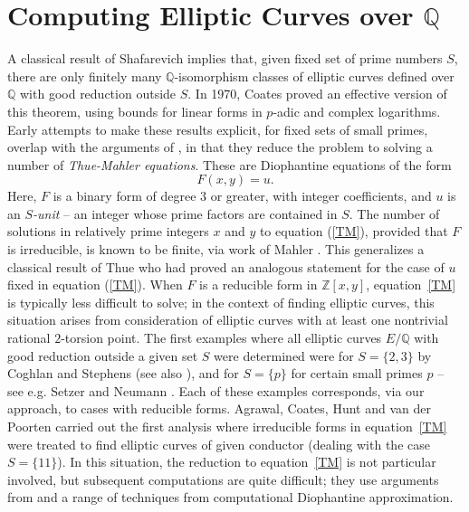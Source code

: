 
\chapter{Computing Elliptic Curves over $\mathbb{Q}$}
\label{ch:EllipticCurves} 

A classical result of Shafarevich \cite{Shaf} implies that, given  fixed set of prime numbers $S$,  there are only finitely many $\mathbb{Q}$-isomorphism classes of elliptic curves 
defined over $\mathbb{Q}$ with good reduction outside $S$. In 1970, Coates \cite{Coa} proved an effective version of this theorem, using bounds for linear forms in $p$-adic and complex logarithms. Early attempts to make these results explicit, for fixed sets of small primes, overlap with the arguments of \cite{Coa}, in 
that they reduce the problem to solving a number of {\it Thue-Mahler equations}. These are Diophantine equations 
of the form
\begin{equation} \label{TM}
F(x,y) = u.
\end{equation}
Here, $F$ is a binary form of degree $3$ or greater, with integer coefficients, and $u$ is an {\it $S$-unit} -- an integer whose prime factors are 
contained in $S$. The number of solutions in relatively prime integers $x$ and $y$ to equation (\ref{TM}), provided that $F$ is irreducible, is known to be finite, via work of Mahler \cite{Mahler}.
This generalizes a classical result of Thue \cite{Th} who had proved an analogous statement for the case of $u$ fixed in equation (\ref{TM}). When 
$F$ is a reducible form in $\mathbb{Z}[x,y]$, equation~\eqref{TM} is typically less difficult to solve; in the context of finding elliptic curves, this situation arises
from consideration of elliptic curves with at least one nontrivial rational $2$-torsion point. The 
first examples where all elliptic curves $E/\mathbb{Q}$ with good reduction outside a 
given set $S$ were determined were for  $S = \{2, 3 \}$ by Coghlan \cite{Cog} and Stephens \cite{Ste}  (see also \cite{BK}),  and for $S = 
\{p\}$ for certain small primes $p$ -- see e.g. Setzer \cite{Set} and Neumann \cite{Neu}. Each of these examples corresponds, via our approach, 
to cases with reducible forms.  Agrawal, Coates, Hunt and van der 
Poorten \cite{ACHP} carried out the first analysis where irreducible forms in equation~\eqref{TM} were treated to find elliptic curves of given conductor (dealing with the case $S= \{ 11 \}$).  In this situation, the reduction to equation~\eqref{TM} is not particular involved, but subsequent computations are quite difficult; they use 
arguments from \cite{Coa} and a range of techniques from computational Diophantine approximation. 

